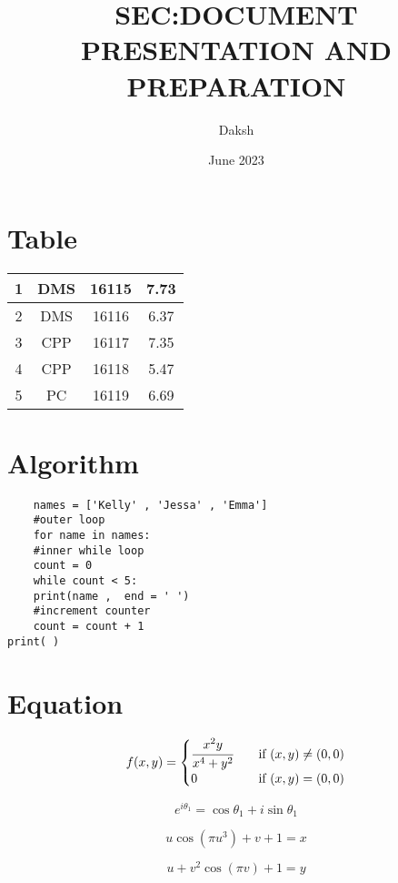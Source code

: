 \documentclass{article}
\title{SEC:DOCUMENT PRESENTATION AND PREPARATION }
\author{Daksh}
\date{June 2023}
\begin{document}
\maketitle

\section{Table}

\begin{center}
\begin{tabular}{ |c|c|c|c| } 
 \hline
 1 & DMS & 16115 & 7.73 \\ 
 \hline
2 & DMS & 16116 & 6.37 \\ 
 \hline
3 & CPP & 16117 & 7.35 \\ 
 \hline
4 & CPP & 16118 & 5.47 \\ 
 \hline
5 & PC & 16119 & 6.69 \\ 
 \hline
\end{tabular}
\end{center}

\section{Algorithm}
\begin{verbatim}
    names = ['Kelly' , 'Jessa' , 'Emma']
    #outer loop
    for name in names:
    #inner while loop
    count = 0
    while count < 5:
    print(name ,  end = ' ')
    #increment counter
    count = count + 1
print( )
\end{verbatim}


\section{Equation}

\[ f(x,y) = \begin{cases}
\cfrac{x^2y}{x^4+y^2} & \quad \text{if }(x,y) \neq (0,0) \\
    0 & \quad \text{if } (x,y) = (0,0) 
\end{cases} \]

\[e^{i\theta_1} = \cos \theta_1 + i\sin \theta_1\]

\[u\cos(\pi u^3) + v + 1 = x\]

\[u + v^2\cos(\pi v) + 1 = y\]
\end{document}
